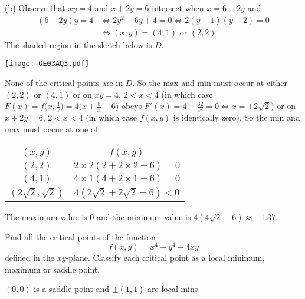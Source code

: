 \begin{solution}
(b) Observe that $xy=4$ and $x+2y=6$ intersect when $x=6-2y$ and
\begin{align*}
(6-2y)y=4
&\iff 2y^2-6y+4=0
\iff 2(y-1)(y-2)=0 \\
&\iff (x,y) = (4,1)\text{ or }(2,2)
\end{align*}
The shaded region in the sketch below is $D$.
\begin{center}
     \texttt{[image: OE03AQ3.pdf]}
\end{center}
None of the critical points are in $D$. So the max and min must occur
at either $(2,2)$ or $(4,1)$ or on $xy=4$, $2<x<4$ (in which case
$F(x)=f\big(x,\frac{4}{x}\big)=4\big(x+\frac{8}{x}-6)$ obeys
$F'(x)=4-\frac{32}{x^2}=0\iff x=\pm2\sqrt{2}$) or on
$x+2y=6$, $2<x<4$ (in which case $f(x,y)$ is identically zero). So the
min and max must occur at one of 
\begin{center}
\renewcommand{\arraystretch}{1.3}
     \begin{tabular}{|c|c|}
     \hline
       $(x,y)$  & $f(x,y)$ \\ \hline
       $(2,2)$  & $2\times 2(2+2\times2-6)=0$ \\ \hline
       $(4,1)$  & $4\times 1(4+2\times 1-6)=0$ \\ \hline
       $(2\sqrt{2},\sqrt{2})$ & $4(2\sqrt{2}+2\sqrt{2}-6)<0$ \\ \hline 
     \end{tabular}
\renewcommand{\arraystretch}{1.0}
\end{center}
The maximum value is $0$ and the minimum value is $4(4\sqrt{2}-6)
\approx -1.37$.
\end{solution}

\begin{question} [M200 2002D] %
Find all the critical points of the function 
\begin{equation*}
f(x,y)=x^4+y^4-4xy
\end{equation*}
defined in the $xy$-plane. Classify each critical point as a local minimum, 
maximum or saddle point.
\end{question}

%

\begin{answer}
$(0,0)$ is a saddle point and $\pm(1,1)$ are local mins
\end{answer}

